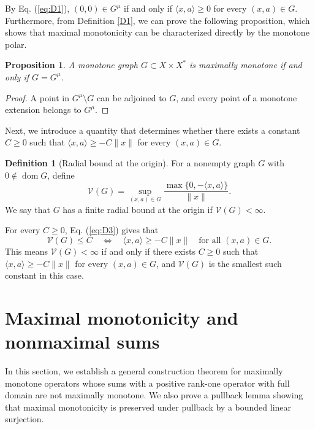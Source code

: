 \documentclass[11pt]{article}
\newcommand{\dom}{\operatorname{dom}}
\newcommand{\pair}[2]{\langle #1,#2\rangle}
\newtheorem{proposition}{Proposition}
\theoremstyle{definition}
\newtheorem{definition}{Definition}
\theoremstyle{remark}
\begin{document}
By Eq. (\ref{eq:D1}), $(0,0)\in G^\mu$ if and only if $\pair{x}{a}\ge0$ for every $(x,a)\in G$. Furthermore, from Definition \ref{D1}, we can prove the following proposition, which shows that maximal monotonicity can be characterized directly by the monotone polar. 


\begin{proposition}
A monotone graph $G\subset X\times X^*$ is maximally monotone if and only if $G=G^\mu$.
\end{proposition}
\begin{proof}
A point in $G^\mu\setminus G$ can be adjoined to $G$, and every point of a monotone extension belongs to $G^\mu$.
\end{proof}


Next, we introduce a quantity that determines whether there exists a constant $C\ge0$ such that $\pair{x}{a}\ge-C\|x\|$ for every $(x,a)\in G$. 

\begin{definition}[Radial bound at the origin]
\label{def:radial-bound}
For a nonempty graph $G$ with $0\notin\dom G$, define
\begin{equation}
\mathcal V(G)=\sup_{(x,a)\in G}
 \frac{\max\{0,-\pair{x}{a}\}}{\|x\|}.
\label{eq:D3}
\end{equation}
We say that $G$ has a finite radial bound at the origin if $\mathcal V(G)<\infty$.
\end{definition}
For every $C\ge0$, Eq. (\ref{eq:D3}) gives that 
\[
\mathcal V(G)\le C
\quad\Longleftrightarrow\quad
\pair{x}{a}\ge-C\|x\|
\quad\text{for all }(x,a)\in G.
\]
This means $\mathcal V(G)<\infty$ if and only if there exists $C\ge0$ such that $\pair{x}{a}\ge-C\|x\|$ for every $(x,a)\in G$, and $\mathcal V(G)$ is the smallest such constant in this case. 





\section{Maximal monotonicity and nonmaximal sums}
\label{sec:endpoint-criterion}

In this section, we establish a general construction theorem for maximally monotone operators whose sums with a positive rank-one operator with full domain are not maximally monotone. We also prove a pullback lemma showing that maximal monotonicity is preserved under pullback by a bounded linear surjection.  
\end{document}
